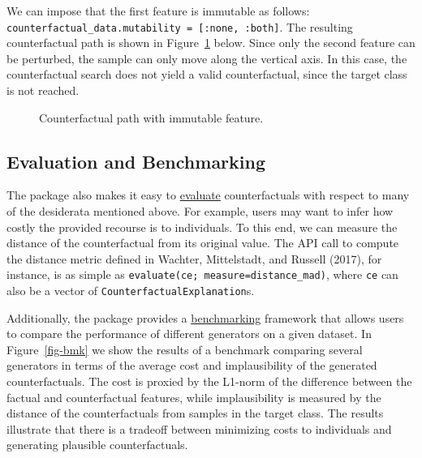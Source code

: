 \documentclass{juliacon}
\begin{document}
We can impose that the first feature is immutable as follows:
\texttt{counterfactual\_data.mutability\ =\ {[}:none,\ :both{]}}. The
resulting counterfactual path is shown in Figure~\ref{fig-mutability}
below. Since only the second feature can be perturbed, the sample can
only move along the vertical axis. In this case, the counterfactual
search does not yield a valid counterfactual, since the target class is
not reached.

\begin{figure}


\caption{\label{fig-mutability}Counterfactual path with immutable
feature.}

\end{figure}%

\subsection{Evaluation and Benchmarking}\label{sec-eval}

The package also makes it easy to
\href{https://juliatrustworthyai.github.io/CounterfactualExplanations.jl/v0.1/tutorials/evaluation/}{evaluate}
counterfactuals with respect to many of the desiderata mentioned above.
For example, users may want to infer how costly the provided recourse is
to individuals. To this end, we can measure the distance of the
counterfactual from its original value. The API call to compute the
distance metric defined in Wachter, Mittelstadt, and Russell (2017), for
instance, is as simple as \texttt{evaluate(ce;\ measure=distance\_mad)},
where \texttt{ce} can also be a vector of
\texttt{CounterfactualExplanation}s.

Additionally, the package provides a
\href{https://juliatrustworthyai.github.io/CounterfactualExplanations.jl/v0.1/tutorials/benchmarking/}{benchmarking}
framework that allows users to compare the performance of different
generators on a given dataset. In Figure~\ref{fig-bmk} we show the
results of a benchmark comparing several generators in terms of the
average cost and implausibility of the generated counterfactuals. The
cost is proxied by the L1-norm of the difference between the factual and
counterfactual features, while implausibility is measured by the
distance of the counterfactuals from samples in the target class. The
results illustrate that there is a tradeoff between minimizing costs to
individuals and generating plausible counterfactuals.
\end{document}

